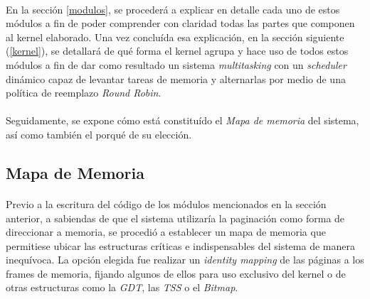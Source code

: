 \documentclass[11pt, a4paper]{article}
\begin{document}
	\paragraph{}
	En la sección \ref{modulos}, se procederá a explicar en detalle cada uno de estos módulos a fin de poder comprender con claridad todas las partes que componen al kernel elaborado. Una vez concluída esa explicación, en la sección siguiente (\ref{kernel}), se detallará de qué forma el kernel agrupa y hace uso de todos estos módulos a fin de dar como resultado un sistema \textit{multitasking} con un \textit{scheduler} dinámico capaz de levantar tareas de memoria y alternarlas por medio de una política de reemplazo \textit{Round Robin}.
	
	\paragraph{}
	Seguidamente, se expone cómo está constituído el \textit{Mapa de memoria} del sistema, así como también el porqué de su elección.
	
	\subsection{Mapa de Memoria}
	\paragraph{}
	Previo a la escritura del código de los módulos mencionados en la sección anterior, a sabiendas de que el sistema utilizaría la paginación como forma de direccionar a memoria, se procedió a establecer un mapa de memoria que permitiese ubicar las estructuras críticas e indispensables del sistema de manera inequívoca. La opción elegida fue realizar un \textit{identity mapping} de las páginas a los frames de memoria, fijando algunos de ellos para uso exclusivo del kernel o de otras estructuras como la \textit{GDT}, las \textit{TSS} o el \textit{Bitmap}.
	
\end{document}
